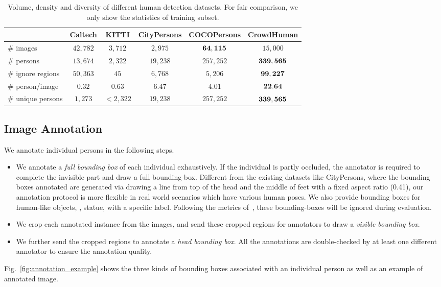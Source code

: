 \documentclass[10pt,twocolumn,letterpaper]{article}
\begin{document}
\begin{table*}[!ht]
\centering
\begin{tabular}{l|ccccc}
\hline
\hline
 & Caltech & KITTI & CityPersons & COCOPersons & CrowdHuman \\
\hline
\# images & $42,782$ & $3,712$ & $2,975$ & ${\bf 64,115}$ & $15,000$ \\
\# persons & $13,674$ & $2,322$ & $19,238$ & $257,252$ & $\bf{339,565}$ \\
\# ignore regions & $50,363$ & $45$ & $6,768$ & $5,206$ & $\bf{99,227}$ \\
\# person/image & $0.32$ & $0.63$ & $6.47$ & $4.01$ & $\bf{22.64}$ \\
\# unique persons & $1,273$ & $< 2,322$ & $19,238$ & $257,252$ & $\bf{339,565}$ \\
\hline
\end{tabular}
\caption{\label{tab:dataset_statistics} Volume, density and diversity of different human detection datasets. For fair comparison, we only show the statistics of training subset.}
\end{table*}


\subsection{Image Annotation}
We annotate individual persons in the following steps. 
\begin{itemize}
    \item We annotate a \emph{full bounding box} of each individual exhaustively. If the individual is partly occluded, the annotator is required to complete the invisible part and draw a full bounding box. Different from the existing datasets like CityPersons, where the bounding boxes annotated are generated via drawing a line from top of the head and the middle of feet with a fixed aspect ratio (0.41), our annotation protocol is more flexible in real world scenarios which have various human poses. We also provide bounding boxes for human-like objects, \eg, statue, with a specific label. Following the metrics of~\cite{dollar2009pedestrian}, these bounding-boxes will be ignored during evaluation.
    \item We crop each annotated instance from the images, and send these cropped regions for annotators to draw a \emph{visible bounding box}.
    \item We further send the cropped regions to annotate a \emph{head bounding box}. All the annotations are double-checked by at least one different annotator to ensure the annotation quality.
\end{itemize}
Fig.~\ref{fig:annotation_example} shows the three kinds of bounding boxes associated with an individual person as well as an example of annotated image. 
\end{document}
